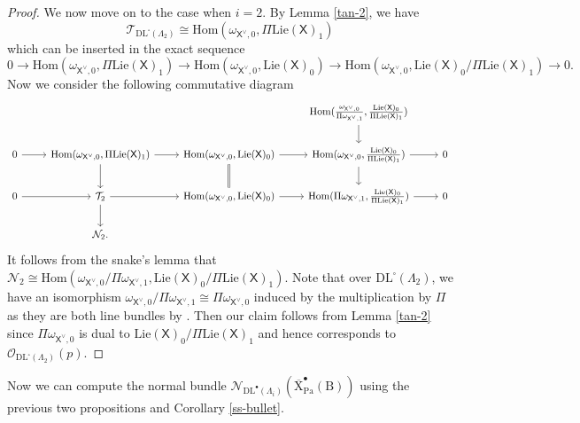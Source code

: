 \documentclass[10pt]{amsart}
\numberwithin{equation}{section}
\theoremstyle{definition}
\def\Lie{\mathrm{Lie}}
\def\Pa{\mathrm{Pa}}
\def\calN{\mathcal{N}}
\def\calO{\mathcal{O}}
\def\calT{\mathcal{T}}
\def\sfX{\mathsf{X}}
\def\rmB{\mathrm{B}}
\def\rmX{\mathrm{X}}
\begin{document}
\begin{proof}
We now move on to the case when $i=2$. By Lemma \ref{tan-2}, we have 
\begin{equation*}
\calT_{\mathrm{DL}^{\square}(\Lambda_{2})}\cong \mathrm{Hom}(\omega_{\sfX^{\vee},0}, \Pi\Lie(\sfX)_{1})
\end{equation*}
which can be inserted in the exact sequence
\begin{equation*}
0\rightarrow \mathrm{Hom}(\omega_{\sfX^{\vee},0}, \Pi\Lie(\sfX)_{1})\rightarrow \mathrm{Hom}(\omega_{\sfX^{\vee},0}, \Lie(\sfX)_{0})\rightarrow \mathrm{Hom}(\omega_{\sfX^{\vee},0}, \Lie(\sfX)_{0}/\Pi\Lie(\sfX)_{1})\rightarrow 0.
\end{equation*}
Now we consider the following commutative diagram 
\begin{equation*}
\begin{tikzcd}
            &                       &                       & \mathrm{Hom}(\frac{\omega_{\sfX^{\vee},0}}{\Pi\omega_{\sfX^{\vee},1}}, \frac{\Lie(\sfX)_{0}}{\Pi\Lie(\sfX)_{1}}) \arrow[d]           &   \\
0 \arrow[r] &\mathrm{Hom}(\omega_{\sfX^{\vee},0}, \Pi\Lie(\sfX)_{1})  \arrow[r] \arrow[d] &  \mathrm{Hom}(\omega_{\sfX^{\vee},0}, \Lie(\sfX)_{0})  \arrow[r] \arrow[d, Rightarrow, no head] & \mathrm{Hom}(\omega_{\sfX^{\vee},0}, \frac{\Lie(\sfX)_{0}}{\Pi\Lie(\sfX)_{1}}) \arrow[r] \arrow[d] & 0 \\
0 \arrow[r] & \calT_{2}  \arrow[r] \arrow[d] & \mathrm{Hom}(\omega_{\sfX^{\vee},0}, \Lie(\sfX)_{0}) \arrow[r]           & \mathrm{Hom}(\Pi\omega_{\sfX^{\vee},1}, \frac{\Lie(\sfX)_{0}}{\Pi\Lie(\sfX)_{1}}) \arrow[r]           & 0 \\
            & \calN_{2}.                   &                       &                       &  
\end{tikzcd}
\end{equation*}
It follows from the snake's lemma that $\calN_{2}\cong \mathrm{Hom}(\omega_{\sfX^{\vee},0}/\Pi\omega_{\sfX^{\vee},1}, \Lie(\sfX)_{0}/\Pi\Lie(\sfX)_{1})$. Note that over $\mathrm{DL}^{\square}(\Lambda_{2})$, we have an isomorphism $\omega_{\sfX^{\vee},0}/\Pi\omega_{\sfX^{\vee},1}\cong \Pi\omega_{\sfX^{\vee},0}$ induced by the multiplication by $\Pi$ as they are both line bundles by \cite[2.5]{Wanga}. Then our claim follows from Lemma \ref{tan-2} since $\Pi \omega_{\sfX^{\vee},0}$ is dual to $\Lie(\sfX)_{0}/\Pi\Lie(\sfX)_{1}$ and hence corresponds to $\calO_{\mathrm{DL}^{\square}(\Lambda_{2})}(p)$.
\end{proof}

Now we can compute the normal bundle $ \calN_{\mathrm{DL}^{\bullet}(\Lambda_{i})}({\overline{\rmX}^{\bullet}_{\Pa}(\rmB)})$ using the previous two propositions and Corollary \ref{ss-bullet}.
\end{document}
